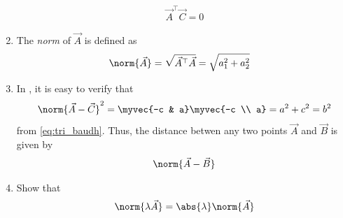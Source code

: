 \begin{enumerate}[label=\thesection.\arabic*.,ref=\thesection.\theenumi]
\begin{align}
  \label{eq:dot2d-orth}
  \vec{A}^{\top} \vec{C}  = 0
\end{align}
\item The {\em norm} of $\vec{A}$ is defined as
\begin{align}
  \label{eq:norm2d}
	\norm{\vec{A}} 
  &= \sqrt{\vec{A}^{\top} \vec{A}}= \sqrt{a_1^2+a_2^2}
\end{align}
\item In 
,	
it is easy to verify that 
\begin{align}
\norm{\vec{A}-\vec{C}}^2  
  = \myvec{-c & a} \myvec{-c \\ a}
= a^2 + c^2 = b^2
\end{align}
from 
	\eqref{eq:tri_baudh}.
Thus, 
	the distance betwen any two  points $\vec{A}$ and $\vec{B}$ is given by 
\begin{align}
  \label{eq:norm2d_dist}
\norm{\vec{A}-\vec{B}} 
\end{align}
\item Show that 
\begin{align}
  \label{eq:norm2d_const}
  \norm{\lambda \vec{A}} 
  = \abs{\lambda} \norm{\vec{A}}
\end{align}
\end{enumerate}

